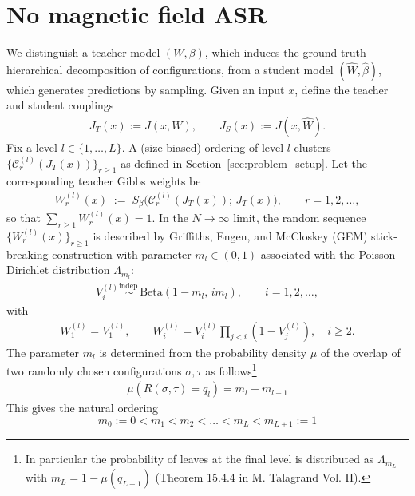 \documentclass{article}
\theoremstyle{remark} %
\begin{document}
\section{No magnetic field ASR}\label{nofiledASR}

We distinguish a teacher model $(W,\beta)$, which induces the ground-truth hierarchical decomposition of configurations, from a student model $(\hat W,\hat\beta)$, which generates predictions by sampling.
Given an input $x$, define the teacher and student couplings
\begin{align}
J_T(x) := J(x,W),\qquad J_S(x):=J(x,\hat W).
\end{align}
Fix a level $l\in\{1,\dots,L\}$. A (size-biased) ordering of level-$l$ clusters
$\{\mathcal C^{(l)}_r(J_T(x))\}_{r\ge1}$ as defined in Section~\ref{sec:problem_setup}.
Let the corresponding teacher Gibbs weights be
\begin{align}
W^{(l)}_r(x)\;:=\;S_\beta \big(\mathcal C^{(l)}_r(J_T(x));\,J_T(x)\big),
\qquad r=1,2,\dots,
\end{align}
so that $\sum_{r\ge1}W^{(l)}_r(x)=1$. In the $N\to\infty$ limit, the random sequence $\{W^{(l)}_r(x)\}_{r\ge1}$ is described
by Griffiths, Engen, and McCloskey (GEM) stick-breaking construction with parameter $m_l\in(0,1)$ associated with the Poisson-Dirichlet distribution $\Lambda_{m_l}$:
\begin{align}
V_i^{(l)} \stackrel{\text{indep.}}{\sim} \mathrm{Beta}(1-m_l,\, i m_l), \qquad i=1,2,\dots,
\end{align}
with
\begin{align}
W^{(l)}_1=V^{(l)}_1,
\qquad
W^{(l)}_i=V^{(l)}_i\prod_{j<i}(1-V^{(l)}_j),\quad i\ge2.
\end{align}
The parameter $m_l$ is determined from the probability density $\mu$ of the overlap of two randomly chosen configurations $\sigma, \tau$ as follows\footnote{In particular the probability of leaves at the final level is distributed as $\Lambda_{m_L}$ with $m_{L}=1- \mu(q_{L+1})$ (Theorem 15.4.4 in M. Talagrand Vol. II). }
\begin{equation}
    \begin{aligned}
        \mu(R(\sigma, \tau)=q_l)=m_l-m_{l-1}
    \end{aligned}
\end{equation}
This gives the natural ordering
\begin{equation}
    m_0:=0<m_1<m_2<\dots<m_L<m_{L+1}:=1
\end{equation}
\end{document}
